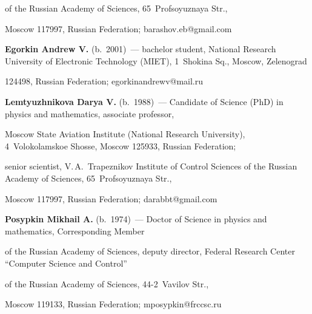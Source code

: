 of the Russian Academy of Sciences, 65~Profsoyuznaya Str.,

Moscow 117997, Russian Federation; \mbox{barashov.eb@gmail.com}



\vspace*{3pt}



\noindent

\textbf{Egorkin Andrew V.} (b.\ 2001)~--- bachelor student, National Research University of Electronic Technology (MIET),  1~Shokina Sq., Moscow, Zelenograd 

124498, Russian Federation; \mbox{egorkinandrewv@mail.ru}



\vspace*{3pt}



\noindent

\textbf{Lemtyuzhnikova Darya V.} (b.\ 1988)~--- Candidate of Science (PhD) in physics and mathematics, associate professor, 

Moscow State Aviation Institute (National Research University), 4~Volokolamskoe Shosse, Moscow 125933, Russian Federation;  

senior scientist, V.\,A.~Trapeznikov Institute of Control Sciences of the Russian Academy of Sciences, 65~Profsoyuznaya Str.,

Moscow 117997, Russian Federation; \mbox{darabbt@gmail.com}



\vspace*{3pt}



\noindent

\textbf{Posypkin Mikhail A.} (b.\ 1974)~--- Doctor of Science in physics and mathematics, Corresponding Member 

of the Russian Academy of Sciences, deputy director, Federal Research Center ``Computer Science and Control'' 

of the Russian Academy of Sciences, 44-2~Vavilov Str.,

Moscow 119133, Russian Federation; \mbox{mposypkin@frccsc.ru}









\label{end\stat}



\renewcommand{\bibname}{\protect\rm Литература}    

